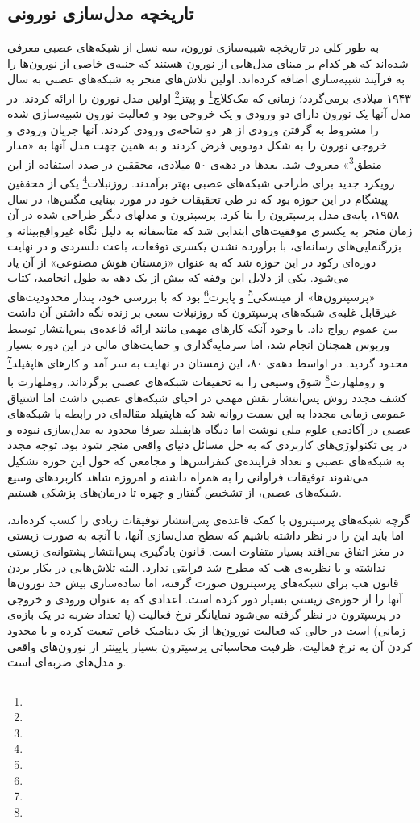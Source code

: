\subsection{تاریخچه مدل‌سازی نورونی}
به طور کلی در تاریخچه شبیه‌سازی نورون، سه نسل از شبکه‌های عصبی معرفی شده‌اند که هر کدام بر مبنای مدل‌هایی از نورون هستند که جنبه‌ی خاصی از نورون‌ها را به فرآیند شبیه‌سازی اضافه کرده‌اند. اولین تلاش‌های منجر به شبکه‌های عصبی به سال ۱۹۴۳ میلادی برمی‌گردد؛ زمانی که مک‌کلاچ\footnote{} و پیتز\footnote{} اولین مدل نورون را ارائه کردند. در مدل آنها یک نورون دارای دو ورودی و یک خروجی بود و فعالیت نورون شبیه‌سازی شده را مشروط به گرفتن ورودی از هر دو شاخه‌ی ورودی کردند. آنها جریان ورودی و خروجی نورون را به شکل دودویی فرض کردند و به همین جهت مدل آنها به «مدار منطق\footnote{}» معروف شد. بعدها در دهه‌ی ۵۰ میلادی، محققین در صدد استفاده از این رویکرد جدید برای طراحی شبکه‌های عصبی بهتر برآمدند. روزنبلات\footnote{} یکی از محققین پیشگام در این حوزه بود که در طی تحقیقات خود در مورد بینایی مگس‌ها، در سال ۱۹۵۸، پایه‌ی مدل پرسپترون را بنا کرد. پرسپترون و مدلهای دیگر طراحی شده در آن زمان منجر به یکسری موفقیت‌های ابتدایی شد که متاسفانه به دلیل نگاه غیرواقع‌بینانه و بزرگنمایی‌های رسانه‌ای، با برآورده نشدن یکسری توقعات، باعث دلسردی و در نهایت دوره‌ای رکود در این حوزه شد که به عنوان «زمستان هوش مصنوعی» از آن یاد می‌شود. یکی از دلایل این وقفه که بیش از یک دهه به طول انجامید، کتاب «پرسپترون‌ها» از مینسکی\footnote{} و پاپرت\footnote{} بود که با بررسی خود، پندار محدودیت‌های غیرقابل غلبه‌ی شبکه‌های پرسپترون که روزنبلات سعی بر زنده نگه داشتن آن داشت بین عموم رواج داد. با وجود آنکه کارهای مهمی مانند ارائه قاعده‌ی پس‌انتشار توسط وربوس همچنان انجام شد، اما سرمایه‌گذاری و حمایت‌های مالی در این دوره بسیار محدود گردید. در اواسط دهه‌ی ۸۰، این زمستان در نهایت به سر آمد و کارهای هاپفیلد\footnote{} و روملهارت\footnote{} شوق وسیعی را به تحقیقات شبکه‌های عصبی برگرداند. روملهارت با کشف مجدد روش پس‌انتشار نقش مهمی در احیای شبکه‌های عصبی داشت اما اشتیاق عمومی زمانی مجددا به این سمت روانه شد که هاپفیلد مقاله‌ای در رابطه با شبکه‌های عصبی در آکادمی علوم ملی نوشت اما دیگاه هاپفیلد صرفا محدود به مدل‌سازی نبوده و در پی تکنولوژی‌های کاربردی که به حل مسائل دنیای واقعی منجر شود بود. توجه مجدد به شبکه‌های عصبی و تعداد فزاینده‌ی کنفرانس‌ها و مجامعی که حول این حوزه تشکیل می‌شوند توفیقات فراوانی را به همراه داشته و امروزه شاهد کاربرد‌های وسیع شبکه‌های عصبی، از تشخیص گفتار و چهره تا درمان‌های پزشکی هستیم.

گرچه شبکه‌های پرسپترون با کمک قاعده‌ی پس‌انتشار توفیقات زیادی را کسب کرده‌اند، اما باید این را در نظر داشته باشیم که سطح مدل‌سازی آنها، با آنچه به صورت زیستی در مغز اتفاق می‌افتد بسیار متفاوت است. قانون یادگیری پس‌انتشار پشتوانه‌ی زیستی نداشته و با نظریه‌ی هب که مطرح شد قرابتی ندارد. البته تلاش‌هایی در بکار بردن قانون هب برای شبکه‌های پرسپترون صورت گرفته، اما ساده‌سازی بیش حد نورون‌ها آنها را از حوزه‌ی زیستی بسیار دور کرده است. اعدادی که به عنوان ورودی و خروجی در پرسپترون در نظر گرفته می‌شود نمایانگر نرخ فعالیت (یا تعداد ضربه در یک بازه‌ی زمانی) است در حالی که فعالیت نورون‌ها از یک دینامیک خاص تبعیت کرده و با محدود کردن آن به نرخ فعالیت، ظرفیت محاسباتی پرسپترون بسیار پایینتر از نورون‌های واقعی و مدل‌های ضربه‌ای است. 

